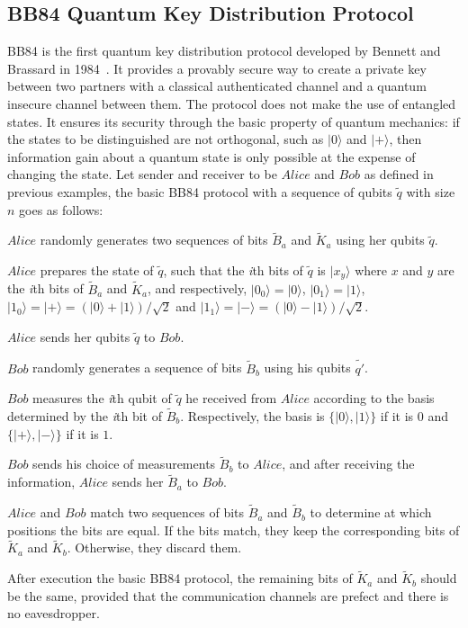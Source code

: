 \documentclass[a4paper,UKenglish,cleveref, autoref]{lipics-v2019}
\begin{document}
\subsection{BB84 Quantum Key Distribution Protocol}
BB84 is the first quantum key distribution protocol developed by Bennett and Brassard in
1984~\cite{BB84}. It provides a provably secure way to create a private key between two partners with a classical authenticated channel and a quantum insecure
channel between them. The protocol does not make the use of entangled states. It ensures its security through the basic property of quantum mechanics: if the states to be distinguished are not orthogonal, such as $|0\rangle$ and $|+\rangle$, then information gain about a quantum state is only
possible at the expense of changing the state. Let sender and receiver to be $Alice$ and $Bob$ as defined in previous examples, the basic BB84 protocol with a sequence of qubits $\tilde{q}$ with size $n$ goes as follows:
\begin{bracketenumerate}
    \item $Alice$ randomly generates two sequences of bits $\tilde{B}_a$ and $\tilde{K}_a$ using her qubits $\tilde{q}$.
    \item $Alice$ prepares the state of $\tilde{q}$, such that the \textit{i}th bits of $\tilde{q}$ is $|x_{y}\rangle$ where $x$ and $y$ are the \textit{i}th bits of $\tilde{B}_a$ and $\tilde{K}_a$, and respectively,  $|0_0\rangle=|0\rangle$, $|0_1\rangle=|1\rangle$, $|1_0\rangle=|+\rangle=(|0\rangle+|1\rangle)/\sqrt{2}$ and $|1_1\rangle=|-\rangle=(|0\rangle-|1\rangle)/\sqrt{2}$.
    \item $Alice$ sends her qubits $\tilde{q}$ to $Bob$.
    \item $Bob$ randomly generates a sequence of bits $\tilde{B}_b$ using his qubits $\tilde{q'}$.
    \item $Bob$ measures the \textit{i}th qubit of $\tilde{q}$ he received from $Alice$ according to the basis determined by the \textit{i}th bit of $\tilde{B}_b$. Respectively, the basis is $\{|0\rangle,|1\rangle\}$ if it is $0$ and $\{|+\rangle,|-\rangle\}$ if it is $1$.
    \item $Bob$ sends his choice of measurements $\tilde{B}_{b}$ to $Alice$, and after receiving the information, $Alice$ sends her $\tilde{B}_{a}$ to $Bob$.
    \item $Alice$ and $Bob$ match two sequences of bits $\tilde{B}_{a}$ and $\tilde{B}_{b}$ to determine at which positions the bits are equal. If the bits match, they keep the corresponding bits of $\tilde{K}_a$ and $\tilde{K}_b$. Otherwise, they discard them.
\end{bracketenumerate}
After execution the basic BB84 protocol, the remaining bits of $\tilde{K}_a$ and $\tilde{K}_b$ should be the same, provided that the communication channels are prefect and there is no eavesdropper.
\end{document}
